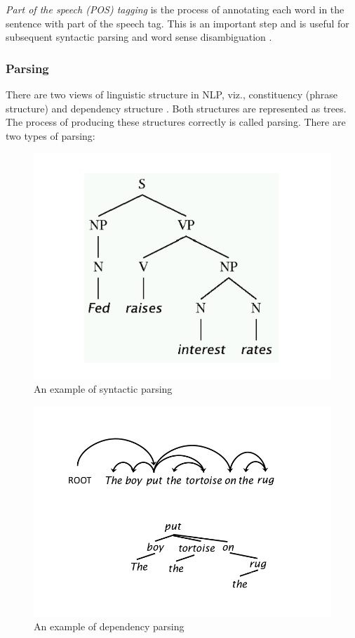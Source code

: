 \textit{Part of the speech (POS) tagging} is the process of annotating each word in the sentence with part of the speech tag. This is an important step and is useful for subsequent syntactic parsing and word sense disambiguation \cite{nlpcourse}. 

\subsubsection{Parsing}

There are two views of linguistic structure in NLP, viz., constituency (phrase structure) and dependency structure \cite{parsing}. Both structures are represented as trees. The process of producing these structures correctly is called parsing. There are two types of parsing:

\begin{figure}
\centering
\includegraphics[scale=0.5]{figures/SyntacticParse.png}
\caption{An example of syntactic parsing}\label{fig:SynParse}
\end{figure}

\begin{figure}
\centering
\includegraphics[scale=0.4]{figures/DependencyParse.png}
\caption{An example of dependency parsing}\label{fig:DepParse}
\end{figure}


